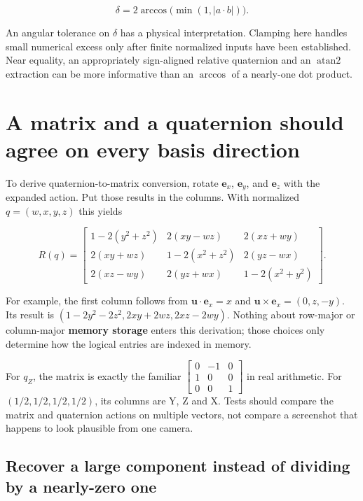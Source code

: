 \[
\delta=2\arccos\bigl(\min(1,|a\cdot b|)\bigr).
\]

An angular tolerance on \(\delta\) has a physical interpretation. Clamping here handles small numerical excess only after finite normalized inputs have been established. Near equality, an appropriately sign-aligned relative quaternion and an \(\operatorname{atan2}\) extraction can be more informative than an \(\arccos\) of a nearly-one dot product.

\section{A matrix and a quaternion should agree on every basis direction}\label{01-foundations-i-ch019-a-matrix-and-a-quaternion-should-agree-on-every-basis-direction}

To derive quaternion-to-matrix conversion, rotate \(\mathbf e_x\), \(\mathbf e_y\), and \(\mathbf e_z\) with the expanded action. Put those results in the columns. With normalized \(q=(w,x,y,z)\) this yields

\[
R(q)=\begin{bmatrix}
1-2(y^2+z^2)&2(xy-wz)&2(xz+wy)\\
2(xy+wz)&1-2(x^2+z^2)&2(yz-wx)\\
2(xz-wy)&2(yz+wx)&1-2(x^2+y^2)
\end{bmatrix}.
\]

For example, the first column follows from \(\mathbf u\cdot\mathbf e_x=x\) and \(\mathbf u\times\mathbf e_x=(0,z,-y)\). Its result is \((1-2y^2-2z^2,2xy+2wz,2xz-2wy)\). Nothing about row-major or column-major \textbf{memory storage} enters this derivation; those choices only determine how the logical entries are indexed in memory.

For \(q_Z\), the matrix is exactly the familiar \(\begin{bmatrix}0&-1&0\\1&0&0\\0&0&1\end{bmatrix}\) in real arithmetic. For \((1/2,1/2,1/2,1/2)\), its columns are Y, Z and X. Tests should compare the matrix and quaternion actions on multiple vectors, not compare a screenshot that happens to look plausible from one camera.

\subsection{Recover a large component instead of dividing by a nearly-zero one}\label{01-foundations-i-ch019-recover-a-large-component-instead-of-dividing-by-a-nearly-zero-one}

